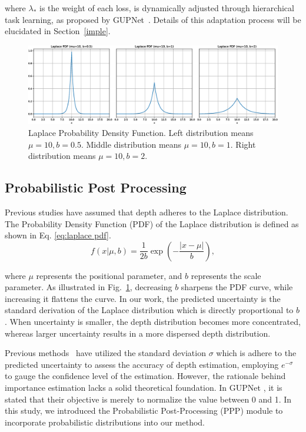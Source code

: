 \documentclass[journal]{IEEEtran}
\begin{document}
	where $\lambda_*$ is the weight of each loss, is dynamically adjusted through hierarchical task learning, as proposed by GUPNet~\cite{gupnet}. Details of this adaptation process will be elucidated in Section~\ref{imple}.
	
	
	
	\begin{figure}[!t]
		\centering
		\includegraphics[width=1.0\linewidth]{laplace_distribution.eps}
		\caption{Laplace Probability Density Function. Left distribution means $\mu=10, b=0.5$. Middle distribution means $\mu=10, b=1$. Right distribution means $\mu=10, b=2$.}
		\label{fig:laplace distribution}
	\end{figure}
	\subsection{Probabilistic Post Processing}\label{post_processing}
	Previous studies have assumed that depth adheres to the Laplace distribution. The Probability Density Function (PDF) of the Laplace distribution is defined as shown in Eq. \eqref{eq:laplace pdf}. 
	\begin{equation}
		f(x|\mu,b)=\frac1{2b}\exp\left(-\frac{|x-\mu|}b\right), 
		\label{eq:laplace pdf}
	\end{equation}
	
	where $\mu$ represents the positional parameter, and $b$ represents the scale parameter. As illustrated in Fig.~\ref{fig:laplace distribution}, decreasing $b$ sharpens the PDF curve, while increasing it flattens the curve. In our work, the predicted uncertainty is the standard derivation of the Laplace distribution which is directly proportional to $b$. When uncertainty is smaller, the depth distribution becomes more concentrated, whereas larger uncertainty results in a more dispersed depth distribution.
	
	Previous methods~\cite{didm3d, gupnet} have utilized the standard deviation $\sigma$ which is adhere to the predicted uncertainty to assess the accuracy of depth estimation, employing $e^{-\sigma}$ to gauge the confidence level of the estimation. However, the rationale behind importance estimation lacks a solid theoretical foundation. In GUPNet \cite{gupnet}, it is stated that their objective is merely to normalize the value between 0 and 1. In this study, we introduced the Probabilistic Post-Processing (PPP) module to incorporate probabilistic distributions into our method.
	
\end{document}
